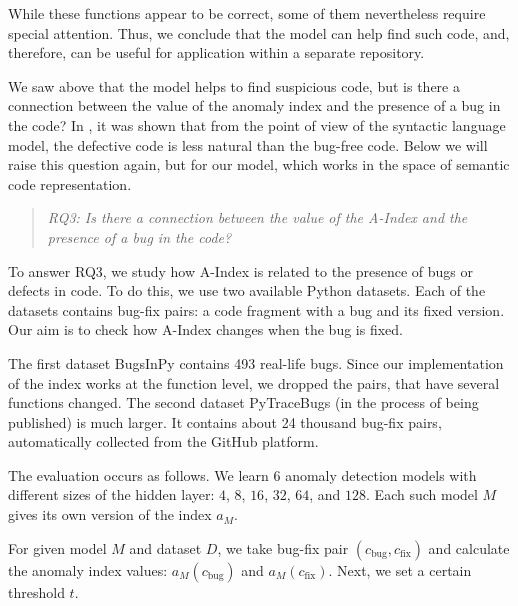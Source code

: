 \documentclass[10pt,conference]{IEEEtran}
\begin{document}
While these functions appear to be correct, some of them nevertheless require special attention.
Thus, we conclude that the model can help find such code, and, therefore, can be useful for application within a separate repository.

\bigskip

We saw above that the model helps to find suspicious code,
 but is there a connection between the value of the anomaly index and the presence of a bug in the code?
In \cite{RayEtAl2016}, it was shown that from the point of view of the syntactic language model,
 the defective code is less natural than the bug-free code.
Below we will raise this question again, but for our model, which works in the space of semantic code representation.

\begin{quote}\emph{RQ3: Is there a connection between the value of the A-Index
 and the presence of a bug in the code?}\end{quote}

To answer RQ3, we study how {\sc A-Index} is related to the presence of bugs or defects in code.
To do this, we use two available Python datasets.
Each of the datasets contains bug-fix pairs: a code fragment with a bug and its fixed version.
Our aim is to check how {\sc A-Index} changes when the bug is fixed.

The first dataset BugsInPy \cite{WidyasariEtAl2020} contains 493 real-life bugs.
Since our implementation of the index works at the function level,
 we dropped the pairs, that have several functions changed.
The second dataset PyTraceBugs (in the process of being published) is much larger.
It contains about 24 thousand bug-fix pairs, automatically collected from the GitHub platform.

The evaluation occurs as follows.
We learn 6 anomaly detection models with different sizes of the hidden layer: $4$, $8$, $16$, $32$, $64$, and $128$.
Each such model $M$ gives its own version of the index $a_M$.

For given model $M$ and dataset $D$,
 we take bug-fix pair $(c_{\mathrm{bug}}, c_{\mathrm{fix}})$ and calculate the anomaly index values: $a_M(c_{\mathrm{bug}})$ and $a_M(c_{\mathrm{fix}})$.
Next, we set a certain threshold $t$.
\end{document}
